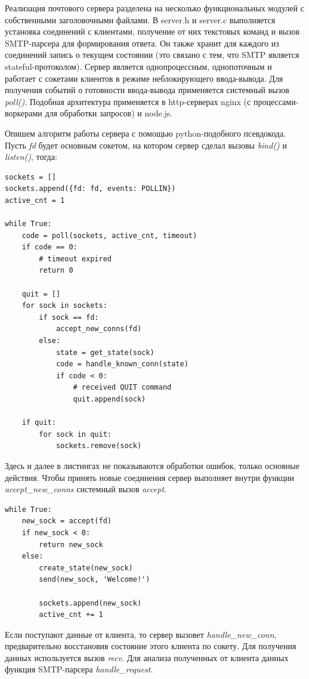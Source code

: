 \documentclass[a4paper,12pt]{report}
\begin{document}
Реализация почтового сервера разделена на несколько функциональных модулей с собственными заголовочными файлами. В server.h и server.c выполняется установка соединений с клиентами, получение от них текстовых команд и вызов SMTP-парсера для формирования ответа. Он также хранит для каждого из соединений запись о текущем состоянии (это связано с тем, что SMTP является stateful-протоколом). Сервер является однопроцессным, однопоточным и работает с сокетами клиентов в режиме неблокирующего ввода-вывода. Для получения событий о готовности ввода-вывода применяется системный вызов \textit{poll()}. Подобная архитектура применяется в http-серверах nginx (с процессами-воркерами для обработки запросов) и node.js.

Опишем алгоритм работы сервера с помощью python-подобного псевдокода. Пусть \textit{fd} будет основным сокетом, на котором сервер сделал вызовы \textit{bind()} и \textit{listen()}, тогда:

\begin{verbatim}
sockets = []
sockets.append({fd: fd, events: POLLIN})
active_cnt = 1

while True:
    code = poll(sockets, active_cnt, timeout)
    if code == 0:
        # timeout expired
    	return 0

    quit = []
    for sock in sockets:
        if sock == fd:
        	accept_new_conns(fd)
        else:
        	state = get_state(sock)
            code = handle_known_conn(state) 
            if code < 0:
                # received QUIT command
                quit.append(sock)

    if quit:
        for sock in quit:
            sockets.remove(sock)
\end{verbatim}

Здесь и далее в листингах не показываются обработки ошибок, только основные действия. Чтобы принять новые соединения сервер выполняет внутри функции \textit{accept_new_conns} системный вызов \textit{accept}.

\begin{verbatim}
while True:
    new_sock = accept(fd)
    if new_sock < 0:
        return new_sock
    else:
        create_state(new_sock)
        send(new_sock, 'Welcome!')

        sockets.append(new_sock)
        active_cnt += 1
\end{verbatim}

Если поступают данные от клиента, то сервер вызовет \textit{handle_new_conn}, предварительно восстановив состояние этого клиента по сокету. Для получения данных используется вызов \textit{recv}. Для анализа полученных от клиента данных функция SMTP-парсера \textit{handle_request}.
\end{document}
